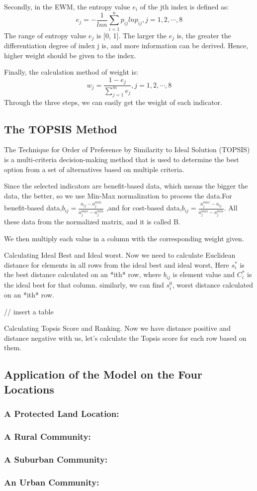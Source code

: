 Secondly, in the EWM, the entropy value $e_i$ of the jth index is defined as:$$e_j=-\frac{1}{lnn}\sum_{i=1}^np_{ij}lnp_{ij},j=1,2,\cdots,8$$
The range of entropy value $e_j$ is [0, 1]. The larger the $e_j$ is, the greater the differentiation degree of index j is, and more information can be derived. Hence, higher weight should be given to the index. 

Finally, the calculation method of weight is:$$w_j=\frac{1-e_j}{\sum_{j=1}^me_j},j=1,2,\cdots,8$$
Through the three steps, we can easily get the weight of each indicator.

\subsection{The TOPSIS Method}
The Technique for Order of Preference by Similarity to Ideal Solution (TOPSIS) is a multi-criteria decision-making method that is used to determine the best option from a set of alternatives based on multiple criteria. 

Since the selected indicators are benefit-based data, which means the bigger the data, the better, so we use Min-Max normalization to process the data.For benefit-based data,$b_{ij}=\frac{a_{ij}-a_j^{min}}{a_j^{max}-a_j^{min}}$ ,and for cost-based data,$b_{ij}=\frac{a_{j}^{max}-a_{ij}}{a_j^{max}-a_j^{min}}$. All these data from the normalized matrix, and it is called B.

We then multiply each value in a column with the corresponding weight given.

Calculating Ideal Best and Ideal worst. Now we need to calculate Euclidean distance for elements in all rows from the ideal best and ideal worst, Here $s_i^*$ is the best distance calculated on an *ith* row, where $b_{ij}$ is element value and $C_i^{*}$ is the ideal best for that column. similarly, we can find $s_i^0$, worst distance calculated on an *ith* row.

// insert a table

Calculating Topsis Score and Ranking. Now we have distance positive and distance negative with us, let’s calculate the Topsis score for each row based on them.

\subsection{Application of the Model on the Four Locations}
\subsubsection{A Protected Land Location: }
\subsubsection{A Rural Community: }
\subsubsection{A Suburban Community: }
\subsubsection{An Urban Community: }